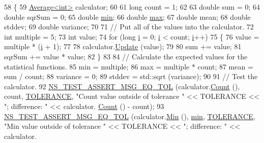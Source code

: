 \begin{DoxyCode}
58 \{
59   \hyperlink{classns3_1_1Average}{Average<int>} calculator;
60 
61   \textcolor{keywordtype}{long} count = 1;
62 
63   \textcolor{keywordtype}{double} sum = 0;
64   \textcolor{keywordtype}{double} sqrSum = 0;
65   \textcolor{keywordtype}{double} \hyperlink{80211b_8c_ac6afabdc09a49a433ee19d8a9486056d}{min};
66   \textcolor{keywordtype}{double} \hyperlink{80211b_8c_affe776513b24d84b39af8ab0930fef7f}{max};
67   \textcolor{keywordtype}{double} mean;
68   \textcolor{keywordtype}{double} stddev;
69   \textcolor{keywordtype}{double} variance;
70 
71   \textcolor{comment}{// Put all of the values into the calculator.}
72   \textcolor{keywordtype}{int} multiple = 5;
73   \textcolor{keywordtype}{int} value;
74   \textcolor{keywordflow}{for} (\textcolor{keywordtype}{long} \hyperlink{bernuolliDistribution_8m_a6f6ccfcf58b31cb6412107d9d5281426}{i} = 0; \hyperlink{bernuolliDistribution_8m_a6f6ccfcf58b31cb6412107d9d5281426}{i} < count; \hyperlink{bernuolliDistribution_8m_a6f6ccfcf58b31cb6412107d9d5281426}{i}++)
75     \{
76       value = multiple * (\hyperlink{bernuolliDistribution_8m_a6f6ccfcf58b31cb6412107d9d5281426}{i} + 1);
77 
78       calculator.\hyperlink{classns3_1_1Average_a223cb5172985f2cf4944488f4ac1186b}{Update} (value);
79 
80       sum    += value;
81       sqrSum += value * value;
82     \}
83 
84   \textcolor{comment}{// Calculate the expected values for the statistical functions.}
85   min = multiple;
86   max = multiple * count;
87   mean = sum / count;
88   variance = 0;
89   stddev = std::sqrt (variance);
90 
91   \textcolor{comment}{// Test the calculator.}
92   \hyperlink{group__testing_ga9e7861b56b4e70db3b56044cb7a28e41}{NS\_TEST\_ASSERT\_MSG\_EQ\_TOL} (calculator.\hyperlink{classns3_1_1Average_abdf7954e5cba2818febdd0588b8e4a20}{Count} (), count, 
      \hyperlink{average-test-suite_8cc_a89311a98397f9d6967d2cb10d5152d77}{TOLERANCE}, \textcolor{stringliteral}{"Count value outside of tolerance "} << TOLERANCE << \textcolor{stringliteral}{"; difference: "} << calculator.
      \hyperlink{classns3_1_1Average_abdf7954e5cba2818febdd0588b8e4a20}{Count} () - count);
93   \hyperlink{group__testing_ga9e7861b56b4e70db3b56044cb7a28e41}{NS\_TEST\_ASSERT\_MSG\_EQ\_TOL} (calculator.\hyperlink{classns3_1_1Average_a4649e7990b939fc55360312ac4ab6828}{Min} (), \hyperlink{80211b_8c_ac6afabdc09a49a433ee19d8a9486056d}{min}, 
      \hyperlink{average-test-suite_8cc_a89311a98397f9d6967d2cb10d5152d77}{TOLERANCE}, \textcolor{stringliteral}{"Min value outside of tolerance "} << TOLERANCE << \textcolor{stringliteral}{"; difference: "} << calculator.

\end{DoxyCode}
